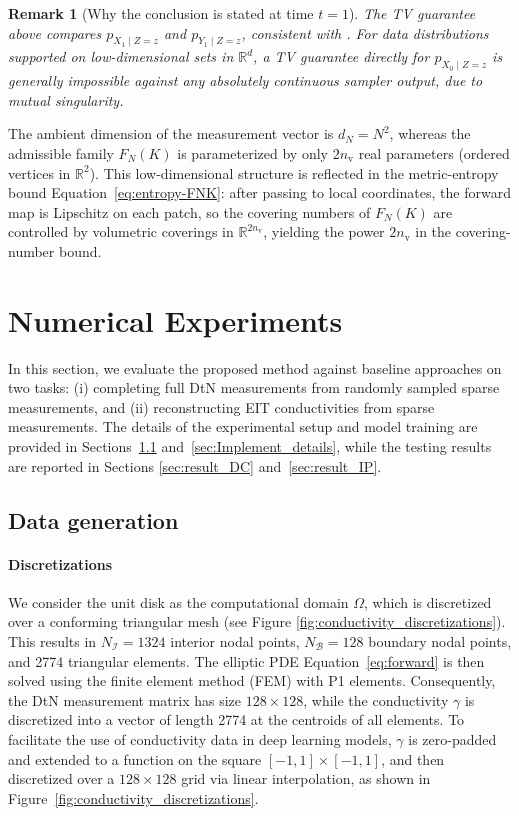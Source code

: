 \documentclass{article}
\def\Eqref#1{Equation~\ref{#1}}
\newcommand{\R}{\mathbb{R}}
\newtheorem{remark}{Remark}[section]
\begin{document}
\begin{remark}[Why the conclusion is stated at time $t=1$]
The TV guarantee above compares $p_{X_1\mid Z=z}$ and $p_{Y_1\mid Z=z}$, consistent with
\citealp[Thm.~2]{liang2025low}. For data distributions supported on low-dimensional sets in $\R^d$,
a TV guarantee directly for $p_{X_0\mid Z=z}$ is generally impossible against any absolutely continuous
sampler output, due to mutual singularity.
\end{remark}

The ambient dimension of the measurement vector is $d_N=N^2$, whereas the admissible family $F_N(K)$ is
parameterized by only $2n_{\mathrm v}$ real parameters (ordered vertices in $\R^2$).
This low-dimensional structure is reflected in the metric-entropy bound \Eqref{eq:entropy-FNK}:
after passing to local coordinates, the forward map is Lipschitz on each patch, so the covering numbers of
$F_N(K)$ are controlled by volumetric coverings in $\R^{2n_{\mathrm v}}$, yielding the power $2n_{\mathrm v}$
in the covering-number bound.

\section{Numerical Experiments}\label{sec:numeric}

In this section, we evaluate the proposed method against baseline approaches on two tasks: (i) completing full DtN measurements from randomly sampled sparse measurements, and (ii) reconstructing EIT conductivities from sparse measurements. The details of the experimental setup and model training are provided in Sections~\ref{sec:data_gen} and~\ref{sec:Implement_details}, while the testing results are reported in Sections \ref{sec:result_DC} and~\ref{sec:result_IP}.

\subsection{Data generation}\label{sec:data_gen}
\paragraph{Discretizations} We consider the unit disk as the computational domain $\Omega$, which is discretized over a conforming triangular mesh (see Figure \ref{fig:conductivity_discretizations}). 
 This results in $N_\mathcal{I} = 1324$ interior nodal points, $N_\mathcal{B} = 128$ boundary nodal points, and 2774 triangular elements. The elliptic PDE \Eqref{eq:forward} is then solved using the finite element method (FEM) with P1 elements. Consequently, the DtN measurement matrix has size $128 \times 128$, while the conductivity $\gamma$ is discretized into a vector of length 2774 at the centroids of all elements. To facilitate the use of conductivity data in deep learning models, $\gamma$ is zero-padded and extended to a function on the square $[-1,1]\times[-1,1]$, and then discretized over a $128 \times 128$ grid via linear interpolation, as shown in Figure~\ref{fig:conductivity_discretizations}.  
\end{document}
